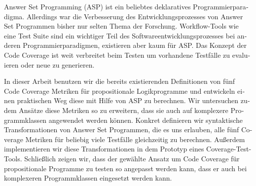     
 
 
 
    
    \vfill

    \begin{otherlanguage}{ngerman}
        Answer Set Programming (ASP) ist ein beliebtes deklaratives Programmierparadigma. Allerdings war die Verbesserung des Entwicklungsprozesses von Answer Set Programmen bisher nur selten Thema der Forschung. Workflow-Tools wie eine Test Suite sind ein wichtiger Teil des Softwareentwicklungsprozesses bei anderen Programmierparadigmen, existieren aber kaum für ASP. Das Konzept der Code Coverage ist weit verbreitet beim Testen um vorhandene Testfälle zu evaluieren oder neue zu generieren.

        In dieser Arbeit benutzen wir die bereits existierenden Definitionen von fünf Code Coverage Metriken für propositionale Logikprogramme und entwickeln einen praktischen Weg diese mit Hilfe von ASP zu berechnen. Wir untersuchen zudem Ansätze diese Metriken so zu erweitern, dass sie auch auf komplexere Programmklassen angewendet werden können. Konkret definieren wir syntaktische Transformationen von Answer Set Programmen, die es uns erlauben, alle fünf Coverage Metriken für beliebig viele Testfälle gleichzeitig zu berechnen. Außerdem implementieren wir diese Transformationen in dem Prototyp eines Coverage-Test-Tools. Schließlich zeigen wir, dass der gewählte Ansatz um Code Coverage für propositionale Programme zu testen so angepasst werden kann, dass er auch bei komplexeren Programmklassen eingesetzt werden kann.
    \end{otherlanguage}

    \vfill
\endgroup

\cleardoublepage




\tableofcontents

\cleardoublepage
